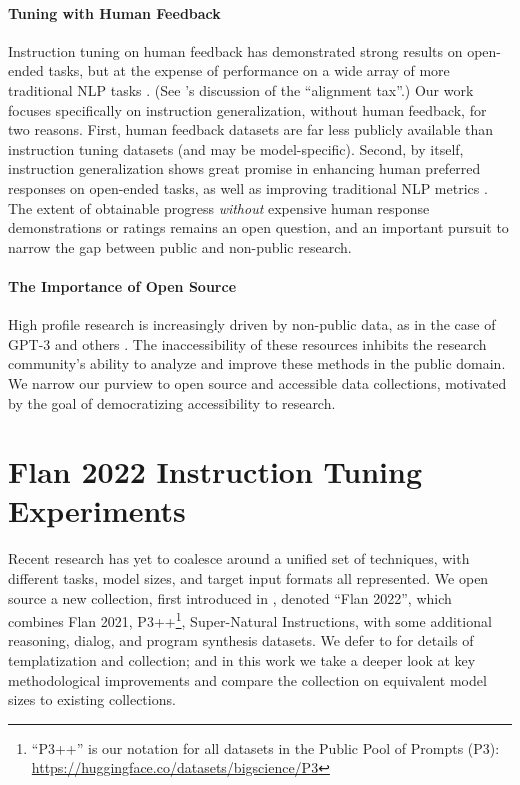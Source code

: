 \paragraph{Tuning with Human Feedback} Instruction tuning on human feedback has demonstrated strong results on open-ended tasks, but at the expense of performance on a wide array of more traditional NLP tasks \citep{ouyang2022training, glaese2022improving, bai2022training, nakano2021webgpt}. (See \citet{ouyang2022training}'s discussion of the ``alignment tax''.) Our work focuses specifically on instruction generalization, without human feedback, for two reasons. First, human feedback datasets are far less publicly available than instruction tuning datasets (and may be model-specific). Second, by itself, instruction generalization shows great promise in enhancing human preferred responses on open-ended tasks, as well as improving traditional NLP metrics \citep{chung2022scaling}. The extent of obtainable progress \emph{without} expensive human response demonstrations or ratings remains an open question, and an important pursuit to narrow the gap between public and non-public research.

\paragraph{The Importance of Open Source}

High profile research is increasingly driven by non-public data, as in the case of GPT-3 and others \citep{ouyang2022training, glaese2022improving}. The inaccessibility of these resources inhibits the research community's ability to analyze and improve these methods in the public domain. We narrow our purview to open source and accessible data collections, motivated by the goal of democratizing accessibility to research.

\section{Flan 2022 Instruction Tuning Experiments}
\label{sec:flan-it-exps}

Recent research has yet to coalesce around a unified set of techniques, with different tasks, model sizes, and target input formats all represented. We open source a new collection, first introduced in \citet{chung2022scaling}, denoted ``Flan 2022'', which combines Flan 2021, P3++\footnote{``P3++'' is our notation for all datasets in the Public Pool of Prompts (P3): \url{https://huggingface.co/datasets/bigscience/P3}}, Super-Natural Instructions, with some additional reasoning, dialog, and program synthesis datasets. We defer to \citet{chung2022scaling} for details of templatization and collection; and in this work we take a deeper look at key methodological improvements and compare the collection on equivalent model sizes to existing collections.

